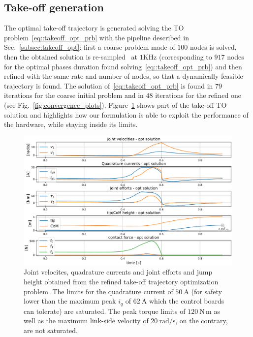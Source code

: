 \subsection{Take-off generation}
The optimal take-off trajectory is generated solving the TO problem~\eqref{eq::takeoff_opt_prb} with the pipeline described in Sec.~\ref{subsec:takeoff_opt}: first a coarse problem made of $100$ nodes is solved, then the obtained solution is re-sampled~\cite{to::horizon_to} at  $1\mathrm{KHz}$ (corresponding to $917$ nodes for the optimal phases duration found solving~\eqref{eq::takeoff_opt_prb}) and then refined with the same rate and number of nodes, so that a dynamically feasible trajectory is found. The solution of~\eqref{eq::takeoff_opt_prb} is found in $79$ iterations for the coarse initial problem and in $48$ iterations for the refined one (see Fig.~\ref{fig:convergence_plots}). 
Figure~\ref{fig:takeoff_opt_data} shows part of the take-off TO solution and highlights how our formulation is able to exploit the performance of the hardware, while staying inside its limits. 
\begin{figure}[h]
	\centering
	\includegraphics[width=1\columnwidth]{images/hardware_saturation_opt.pdf}
	\caption{Joint velocites, quadrature currents and joint efforts and jump height obtained from the refined take-off trajectory optimization problem. The limits for the quadrature current of $50~\mathrm{A}$ (for safety lower than the maximum peak $i_q$ of $62~\mathrm{A}$ which the control boards can tolerate) are saturated. The peak torque limits of $120~\mathrm{N\,m}$ as well as the maximum link-side velocity of $20~\mathrm{rad/s}$, on the contrary, are not saturated.}
	\label{fig:takeoff_opt_data}
\end{figure}
